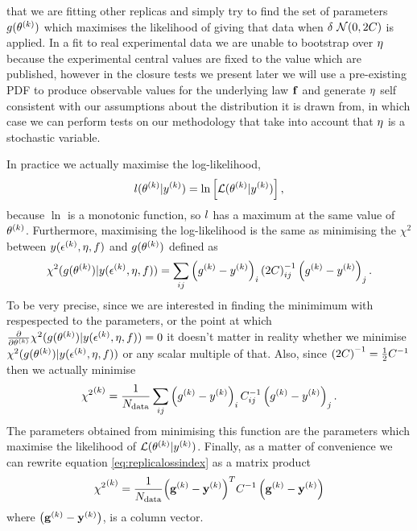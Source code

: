 that we are fitting other replicas and simply try to find the set of parameters
$g(\theta^{(k)})$ which maximises the likelihood of giving that data
when $\delta ~ \mathcal{N}(0, 2C)$ is applied. In a fit to real experimental
data we are unable to
bootstrap over $\mathbf{\eta}$ because the experimental central values are fixed
to the value which are published, however in the closure tests we present later
we will use a pre-existing PDF to produce observable values for the underlying
law $\mathbf{f}$ and generate $\mathbf{\eta}$ self consistent with our assumptions
about the distribution it is drawn from, in which case we can perform tests on
our methodology that take into account that $\mathbf{\eta}$ is a stochastic
variable.

In practice we actually maximise the log-likelihood,
\begin{equation}
    l(\theta^{(k)} \vert y^{(k)}) = \ln \left[
        \mathcal{L}(\theta^{(k)} \vert y^{(k)}) \right],
\end{equation}
because $\ln$ is a monotonic function, so $l$ has a maximum at the same value
of $\theta^{(k)}$. Furthermore, maximising the log-likelihood is the same
as minimising the $\chi^2$ between $y(\epsilon^{(k)}, \eta, f)$
and $g(\theta^{(k)})$ defined as
\begin{equation}
    \chi^2(g(\theta^{(k)}) \vert y(\epsilon^{(k)}, \eta, f))
    = \sum_{ij} \left( g^{(k)} - y^{(k)} \right)_i {(2C)}^{-1}_{ij} \left( g^{(k)} - y^{(k)} \right)_j.
\end{equation}
To be very precise, since
we are interested in finding the minimimum with respespected to the parameters,
or the point at which
$\frac{\partial}{\partial \theta^{(k)}}
\chi^2(g(\theta^{(k)})\vert y(\epsilon^{(k)}, \eta, f)) = 0$
it doesn't matter in reality whether we minimise
$\chi^2(g(\theta^{(k)})\vert y(\epsilon^{(k)}, \eta, f))$ or
any scalar multiple of that. Also, since ${(2C)}^{-1} = \frac{1}{2}C^{-1}_{}$
then we actually minimise
\begin{equation}\label{eq:replicalossindex}
    {\chi^2}^{(k)} = \frac{1}{N_{\rm data}} \sum_{ij} \left( g^{(k)} - y^{(k)} \right)_i C^{-1}_{ij} \left( g^{(k)} - y^{(k)} \right)_j.
\end{equation}
The parameters obtained from minimising this function are the parameters which
maximise the likelihood of
$\mathcal{L}(\theta^{(k)} \vert y^{(k)})$. Finally, as a matter
of convenience we can rewrite equation \eqref{eq:replicalossindex} as a matrix
product
\begin{equation}\label{eq:replicaloss}
    {\chi^2}^{(k)} = \frac{1}{N_{\rm data}} {\left( \mathbf{g}^{(k)} - \mathbf{y}^{(k)} \right)}^{T} C^{-1}_{} \left( \mathbf{g}^{(k)} - \mathbf{y}^{(k)} \right)
\end{equation}
where $\left( \mathbf{g}^{(k)} - \mathbf{y}^{(k)} \right)$, is a column vector.

